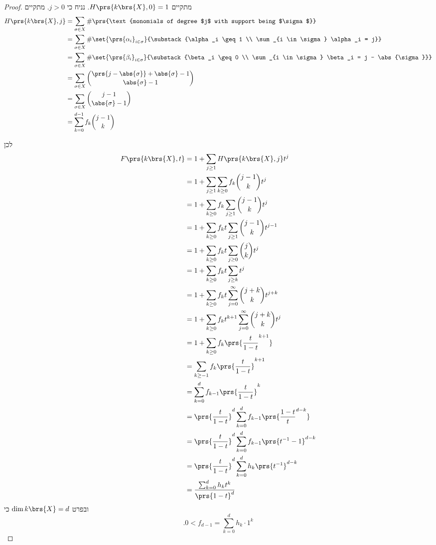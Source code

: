 \documentclass[10pt]{article}
\begin{document}
\begin{proof}
מתקיים
$H\prs{k\brs{X}, 0} = 1$.
נניח כי
$j > 0$.
מתקיים
\begin{align*}
H\prs{k\brs{X}, j} &= \sum_{\sigma \in X} \# \prs{\text{monomials of degree $j$ with support being $\sigma$}}
\\&=
\sum_{\sigma \in X} \# \set{\prs{\alpha_i}_{i \in \sigma}}{\substack{\alpha_i \geq 1 \\ \sum_{i \in \sigma} \alpha_i = j}}
\\&=
\sum_{\sigma \in X} \# \set{\prs{\beta_i}_{i \in \sigma}}{\substack{\beta_i \geq 0 \\ \sum_{i \in \sigma} \beta_i = j - \abs{\sigma}}}
\\&=
\sum_{\sigma \in X} \binom{\prs{j-\abs{\sigma}} + \abs{\sigma} - 1}{\abs{\sigma} - 1}
\\&=
\sum_{\sigma \in X} \binom{j-1}{\abs{\sigma} - 1}
\\&=
\sum_{k=0}^{d-1} f_k \binom{j-1}{k}
\end{align*}

לכן
\begin{align*}
F\prs{k\brs{X}, t} &= 1 + \sum_{j\geq 1} H\prs{k\brs{X}, j} t^j
\\&=
1 + \sum_{j \geq 1} \sum_{k \geq 0} f_k \binom{j-1}{k} t^{j}
\\&=
1 + \sum_{k \geq 0} f_k \sum_{j \geq 1} \binom{j-1}{k} t^j
\\&=
1 + \sum_{k \geq 0} f_k t \sum_{j \geq 1} \binom{j-1}{k} t^{j-1}
\\&=
1 + \sum_{k \geq 0} f_k t \sum_{j \geq 0} \binom{j}{k} t^j
\\&=
1 + \sum_{k \geq 0} f_k t \sum_{j \geq k} t^j
\\&=
1 + \sum_{k \geq 0} f_k t \sum_{j=0}^{\infty} \binom{j+k}{k} t^{j+k}
\\&=
1 + \sum_{k \geq 0} f_k t^{k+1} \sum_{j=0}^{\infty} \binom{j+k}{k} t^j
\\&=
1 + \sum_{k \geq 0} f_k \prs{\frac{t}{1-t}^{k+1}}
\\&=
\sum_{k \geq -1} f_k \prs{\frac{t}{1-t}}^{k+1}
\\&=
\sum_{k = 0}^d f_{k-1} \prs{\frac{t}{1-t}}^k
\\&= \prs{\frac{t}{1-t}}^d \sum_{k=0}^d f_{k-1} \prs{\frac{1-t}{t}^{d-k}}
\\&= \prs{\frac{t}{1-t}}^d \sum_{k=0}^d f_{k-1} \prs{t^{-1} - 1}^{d-k}
\\&= \prs{\frac{t}{1-t}}^d \sum_{k=0}^d h_k \prs{t^{-1}}^{d-k}
\\&= \frac{\sum_{k=0}^d h_k t^k}{\prs{1-t}^d}
\end{align*}
ובפרט
$\dim k\brs{X} = d$
כי
\[\text{.} 0 < f_{d-1} = \sum_{k=0}^d h_k \cdot 1^k\]
\end{proof}
\end{document}

